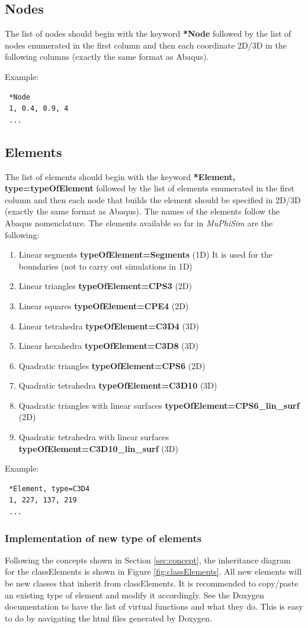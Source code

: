 \documentclass[oneside,11pt,times]{book}
\begin{document}
\subsection{Nodes}
The list of nodes should begin with the keyword \textbf{*Node} followed by the list of nodes enumerated in the first column and then each coordinate 2D/3D in the following columns (exactly the same format as Abaqus).

Example:
\begin{lstlisting}
 *Node
 1, 0.4, 0.9, 4
 ...
\end{lstlisting}


\subsection{Elements}
The list of elements should begin with the keyword \textbf{*Element, type=typeOfElement} followed by the list of elements enumerated in the first column and then each node that builds the element should be specified in 2D/3D (exactly the same format as Abaqus). The names of the elements follow the Abaqus nomenclature. The elements available so far in \textit{MuPhiSim} are the following:
\begin{enumerate}
\item Linear segments \textbf{typeOfElement=Segments} (1D) It is used for the boundaries (not to carry out simulations in 1D)
\item Linear triangles \textbf{typeOfElement=CPS3} (2D)
\item Linear squares \textbf{typeOfElement=CPE4} (2D)
\item Linear tetrahedra \textbf{typeOfElement=C3D4} (3D)
\item Linear hexahedra \textbf{typeOfElement=C3D8} (3D)
\item Quadratic triangles \textbf{typeOfElement=CPS6} (2D)
\item Quadratic tetrahedra \textbf{typeOfElement=C3D10} (3D)
\item Quadratic triangles with linear surfaces \textbf{typeOfElement=CPS6\_lin\_surf} (2D)
\item Quadratic tetrahedra with linear surfaces \textbf{typeOfElement=C3D10\_lin\_surf} (3D)
\end{enumerate}

Example:
\begin{lstlisting}
 *Element, type=C3D4
 1, 227, 137, 219
 ...
\end{lstlisting}

\subsubsection*{Implementation of new type of elements}
Following the concepts shown in Section \ref{sec:concept}, the inheritance diagram for the classElements is shown in Figure \ref{fig:classElements}. All new elements will be new classes that inherit from classElements. It is recommended to copy/paste an existing type of element and modify it accordingly. See the Doxygen documentation to have the list of virtual functions and what they do. This is easy to do by navigating the html files generated by Doxygen.
\end{document}
